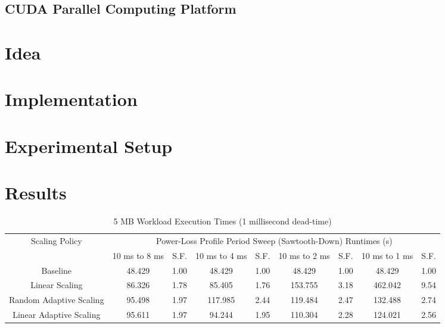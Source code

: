 \documentclass[journal, twoside]{IEEEtran}
\begin{document}
\subsection{CUDA Parallel Computing Platform}

\lipsum[4]

\section{Idea}

\lipsum[4]

\section{Implementation}

\lipsum[12]

\section{Experimental Setup}

\lipsum[2]

\section{Results}

\lipsum[4]

\begin{table*}
    \renewcommand{\arraystretch}{1.3} %
    \caption{5 MB Workload Execution Times (1 millisecond dead-time)}
    \label{main-workload-results-1ms}
    \centering
    \begin{tabular}{c||c|c|c|c|c|c|c|c}
        \hline
        \multirow{2}{*}{Scaling Policy} & \multicolumn{8}{c}{Power-Loss Profile Period Sweep (Sawtooth-Down) Runtimes (s)} \\\cline{2-9}
        {} & {10 ms to 8 ms} & {S.F.} & {10 ms to 4 ms} & {S.F.} & {10 ms to 2 ms} & {S.F.} & {10 ms to 1 ms} & {S.F.} \\
        \hline
        \hline
        {Baseline}                  & {48.429} & {1.00} & {48.429}  & {1.00} & {48.429}  & {1.00} & {48.429}  & {1.00}\\
        {Linear Scaling}            & {86.326} & {1.78} & {85.405}  & {1.76} & {153.755} & {3.18} & {462.042} & {9.54}\\
        {Random Adaptive Scaling}   & {95.498} & {1.97} & {117.985} & {2.44} & {119.484} & {2.47} & {132.488} & {2.74}\\
        {Linear Adaptive Scaling}   & {95.611} & {1.97} & {94.244}  & {1.95} & {110.304} & {2.28} & {124.021} & {2.56}\\
        \hline
    \end{tabular}
\end{table*}
\end{document}
